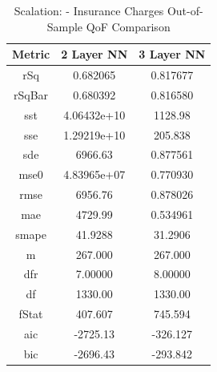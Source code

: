 \documentclass{article}
\begin{document}
\begin{table}[H]
\centering
\caption{Scalation: - Insurance Charges Out-of-Sample QoF Comparison}
\label{tab:Scalation: - Insurance Charges Out-of-Sample QoF Comparison}
\begin{tabular}{|c|c|c|} \hline 
Metric & 2 Layer NN & 3 Layer NN \\ \hline \hline 
rSq & 0.682065 & 0.817677 \\ \hline 
rSqBar & 0.680392 & 0.816580 \\ \hline 
sst & 4.06432e+10 & 1128.98 \\ \hline 
sse & 1.29219e+10 & 205.838 \\ \hline 
sde & 6966.63 & 0.877561 \\ \hline 
mse0 & 4.83965e+07 & 0.770930 \\ \hline 
rmse & 6956.76 & 0.878026 \\ \hline 
mae & 4729.99 & 0.534961 \\ \hline 
smape & 41.9288 & 31.2906 \\ \hline 
m & 267.000 & 267.000 \\ \hline 
dfr & 7.00000 & 8.00000 \\ \hline 
df & 1330.00 & 1330.00 \\ \hline 
fStat & 407.607 & 745.594 \\ \hline 
aic & -2725.13 & -326.127 \\ \hline 
bic & -2696.43 & -293.842 \\ \hline 
\end{tabular}
\end{table}
\end{document}
